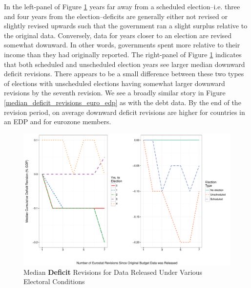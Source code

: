 \documentclass[]{article}
\begin{document}
In the left-panel of Figure \ref{median_deficit_revisions} years far away from a scheduled election--i.e. three and four years from the election--deficits are generally either not revised or slightly revised upwards such that the government ran a slight surplus relative to the original data. Conversely, data for years closer to an election are revised somewhat downward. In other words, governments spent more relative to their income than they had originally reported. The right-panel of Figure \ref{median_deficit_revisions} indicates that both scheduled and unscheduled election years see larger median downward deficit revisions. There appears to be a small difference between these two types of elections with unscheduled elections having somewhat larger downward revisions by the seventh revision. We see a broadly similar story in Figure \ref{median_deficit_revisions_euro_edp} as with the debt data. By the end of the revision period, on average downward deficit revisions are higher for countries in an EDP and for eurozone members.

\begin{figure}
    \begin{center}
        \caption{Median \textbf{Deficit} Revisions for Data Released Under Various Electoral Conditions}
        \label{median_deficit_revisions}
        \includegraphics[scale=0.55]{figures/median_deficit_revisions.pdf}
    \end{center}
\end{figure}
\end{document}
